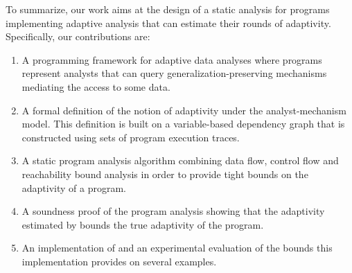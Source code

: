 To summarize, our work aims at the design of a static analysis for programs implementing adaptive analysis that can estimate their rounds of adaptivity. Specifically, our contributions are:
\begin{enumerate}
    \item A programming framework for adaptive data analyses where programs represent analysts that can query generalization-preserving mechanisms mediating the access to some data. 
    \item 
    A formal definition of the notion of adaptivity under the analyst-mechanism model. 
    This definition is built on a variable-based dependency graph that is constructed using sets of program execution traces.
    \item 
    A static program analysis algorithm {\THESYSTEM} combining data flow, control flow and  reachability bound analysis in order to provide tight bounds on the adaptivity of a program.
    \item A soundness proof of the program analysis showing that the adaptivity estimated by {\THESYSTEM} bounds the true adaptivity of the program. 
    \item An implementation of {\THESYSTEM} and an experimental evaluation of the bounds this implementation provides on several examples.
\end{enumerate}
